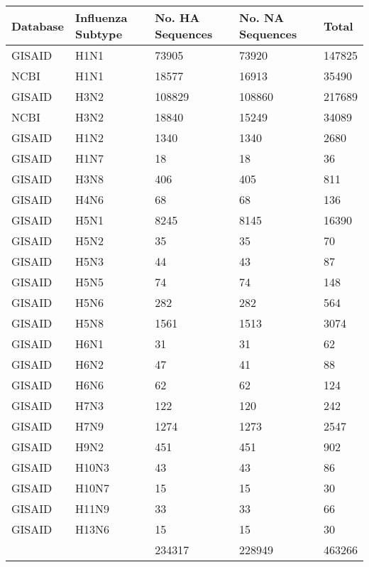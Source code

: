 \begin{tabular}{L{1in}|L{1in}|L{1in}|L{1in}|L{1in}}\hline
 Database & Influenza  Subtype & No.  HA  Sequences & No.  NA  Sequences & Total \\\hline
GISAID&H1N1&73905&73920&147825\\\hline
NCBI&H1N1&18577&16913&35490\\\hline
GISAID&H3N2&108829&108860&217689\\\hline
NCBI&H3N2&18840&15249&34089\\\hline
GISAID&H1N2&1340&1340&2680\\\hline
GISAID&H1N7&18&18&36\\\hline
GISAID&H3N8&406&405&811\\\hline
GISAID&H4N6&68&68&136\\\hline
GISAID&H5N1&8245&8145&16390\\\hline
GISAID&H5N2&35&35&70\\\hline
GISAID&H5N3&44&43&87\\\hline
GISAID&H5N5&74&74&148\\\hline
GISAID&H5N6&282&282&564\\\hline
GISAID&H5N8&1561&1513&3074\\\hline
GISAID&H6N1&31&31&62\\\hline
GISAID&H6N2&47&41&88\\\hline
GISAID&H6N6&62&62&124\\\hline
GISAID&H7N3&122&120&242\\\hline
GISAID&H7N9&1274&1273&2547\\\hline
GISAID&H9N2&451&451&902\\\hline
GISAID&H10N3&43&43&86\\\hline
GISAID&H10N7&15&15&30\\\hline
GISAID&H11N9&33&33&66\\\hline
GISAID&H13N6&15&15&30\\\hline
&&234317&228949&463266\\\hline
\hline\end{tabular}
